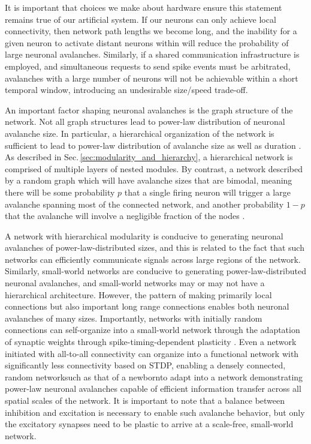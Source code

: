 It is important that choices we make about hardware ensure this statement remains true of our artificial system. If our neurons can only achieve local connectivity, then network path lengths we become long, and the inability for a given neuron to activate distant neurons within will reduce the probability of large neuronal avalanches. Similarly, if a shared communication infrastructure is employed, and simultaneous requests to send spike events must be arbitrated, avalanches with a large number of neurons will not be achievable within a short temporal window, introducing an undesirable size/speed trade-off.

An important factor shaping neuronal avalanches is the graph structure of the network. Not all graph structures lead to power-law distribution of neuronal avalanche size. In particular, a hierarchical organization of the network is sufficient to lead to power-law distribution of avalanche size as well as duration \cite{frla2013}. As described in Sec.\,\ref{sec:modularity_and_hierarchy}, a hierarchical network is comprised of multiple layers of nested modules. By contrast, a network described by a random graph which will have avalanche sizes that are bimodal, meaning there will be some probability $p$ that a single firing neuron will trigger a large avalanche spanning most of the connected network, and another probability $1-p$ that the avalanche will involve a negligible fraction of the nodes \cite{frla2013}.

A network with hierarchical modularity is conducive to generating neuronal avalanches of power-law-distributed sizes, and this is related to the fact that such networks can efficiently communicate signals across large regions of the network. Similarly, small-world networks are conducive to generating power-law-distributed neuronal avalanches, and small-world networks may or may not have a hierarchical architecture. However, the pattern of making primarily local connections but also important long range connections enables both neuronal avalanches of many sizes. Importantly, networks with initially random connections can self-organize into a small-world network through the adaptation of synaptic weights through spike-timing-dependent plasticity \cite{shki2006}. Even a network initiated with all-to-all connectivity can organize into a functional network with significantly less connectivity based on STDP, enabling a densely connected, random network\textemdash such as that of a newborn\textemdash to adapt into a network demonstrating power-law neuronal avalanches capable of efficient information transfer across all spatial scales of the network. It is important to note that a balance between inhibition and excitation is necessary to enable such avalanche behavior, but only the excitatory synapses need to be plastic to arrive at a scale-free, small-world network.

